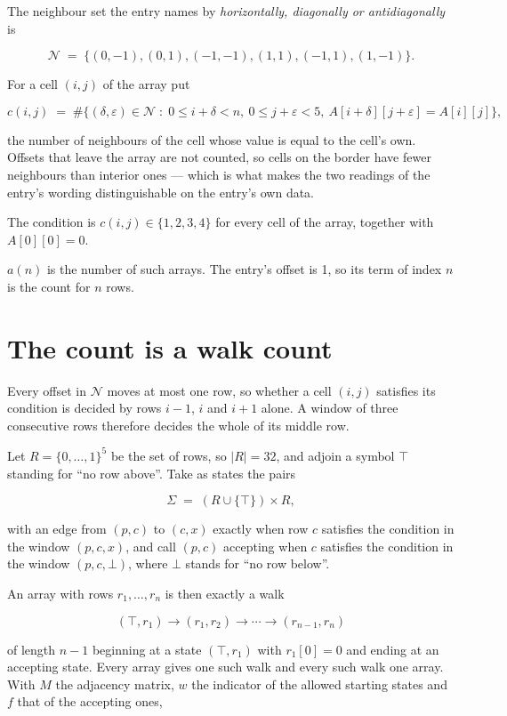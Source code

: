 \documentclass[11pt]{article}
\theoremstyle{definition}
\begin{document}
The neighbour set the entry names by {\itshape horizontally, diagonally or antidiagonally} is

\[\mathcal{N} \;=\; \{(0,-1), (0,1), (-1,-1), (1,1), (-1,1), (1,-1)\}.\]

For a cell $(i,j)$ of the array put

\[c(i,j) \;=\; \#\bigl\{(\delta,\varepsilon)\in\mathcal{N} \;:\; 0\le i+\delta<n,\ 0\le j+\varepsilon<5,\ A[i+\delta][j+\varepsilon] = A[i][j]\bigr\},\]

the number of neighbours of the cell whose value is equal to the cell's own. Offsets that leave the array are not counted, so cells on the border have fewer neighbours than interior ones --- which is what makes the two readings of the entry's wording distinguishable on the entry's own data.

The condition is $c(i,j) \in \{1, 2, 3, 4\}$ for every cell of the array, together with $A[0][0]=0$.

$a(n)$ is the number of such arrays. The entry's offset is 1, so its term of index $n$ is the count for $n$ rows.

\section{The count is a walk count}

Every offset in $\mathcal{N}$ moves at most one row, so whether a cell $(i,j)$ satisfies its condition is decided by rows $i-1$, $i$ and $i+1$ alone. A window of three consecutive rows therefore decides the whole of its middle row.

Let $R = \{0,\dots,1\}^{5}$ be the set of rows, so $|R| = 32$, and adjoin a symbol $\top$ standing for ``no row above''. Take as states the pairs

\[\Sigma \;=\; (R \cup \{\top\}) \times R,\]

with an edge from $(p,c)$ to $(c,x)$ exactly when row $c$ satisfies the condition in the window $(p,c,x)$, and call $(p,c)$ accepting when $c$ satisfies the condition in the window $(p,c,\bot)$, where $\bot$ stands for ``no row below''.

An array with rows $r_1,\dots,r_n$ is then exactly a walk

\[(\top,r_1) \to (r_1,r_2) \to \cdots \to (r_{n-1},r_n)\]

of length $n-1$ beginning at a state $(\top,r_1)$ with $r_1[0]=0$ and ending at an accepting state. Every array gives one such walk and every such walk one array. With $M$ the adjacency matrix, $w$ the indicator of the allowed starting states and $f$ that of the accepting ones,
\end{document}
